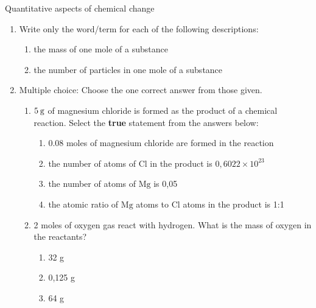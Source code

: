             \begin{eocexercises}{Quantitative aspects of chemical change}
            \nopagebreak \noindent
      \label{m38712*id286171}\begin{enumerate}[noitemsep, label=\textbf{\arabic*}. ] 
            \label{m38712*uid123}\item Write only the word/term for each of the following descriptions:
\label{m38712*id286187}\begin{enumerate}[noitemsep, label=\textbf{\alph*}. ] 
            \label{m38712*uid124}\item the mass of one mole of a substance
\label{m38712*uid125}\item the number of particles in one mole of a substance
\end{enumerate}
                \label{m38712*uid126}\item Multiple choice: Choose the one correct answer from those given.
\label{m38712*id286228}\begin{enumerate}[noitemsep, label=\textbf{\alph*}. ] 
            \label{m38712*uid127}\item $5\phantom{\rule{2pt}{0ex}}\text{g}$ of magnesium chloride is formed as the product of a chemical reaction. Select the \textbf{true} statement from the answers below:
\label{m38712*id286251}\begin{enumerate}[noitemsep, label=\textbf{\roman*}. ] 
            \label{m38712*uid128}\item 0.08 moles of magnesium chloride are formed in the reaction
\label{m38712*uid129}\item the number of atoms of $\text{Cl}$ in the product is $0,6022\ensuremath{\times}{10}^{23}$\label{m38712*uid130}\item the number of atoms of $\text{Mg}$ is 0,05
\label{m38712*uid131}\item the atomic ratio of $\text{Mg}$ atoms to $\text{Cl}$ atoms in the product is 1:1
\end{enumerate}
               \label{m38712*uid132}\item 2 moles of oxygen gas react with hydrogen. What is the mass of oxygen in the reactants?
\label{m38712*id286339}\begin{enumerate}[noitemsep, label=\textbf{\roman*}. ] 
            \label{m38712*uid133}\item 32 g
\label{m38712*uid134}\item 0,125 g
\label{m38712*uid135}\item 64 g

\end{enumerate}
\end{enumerate}
\end{enumerate}
\end{eocexercises}
